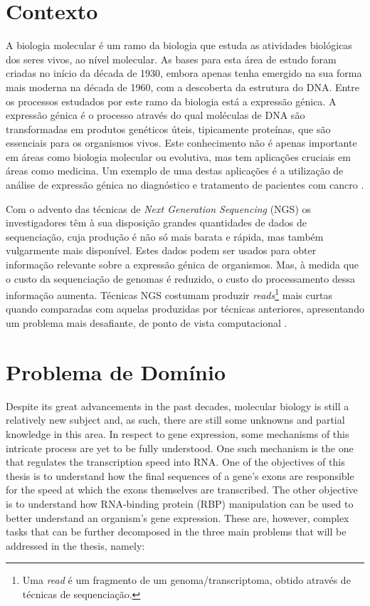 \documentclass[9pt,a4paper]{extarticle}
\begin{document}
\begin{multicols}{2}

\section{Contexto} \label{sec:context}

A biologia molecular é um ramo da biologia que estuda as atividades biológicas
dos seres vivos, ao nível molecular. As bases para esta área de estudo foram
criadas no início da década de 1930, embora apenas tenha emergido na sua forma
mais moderna na década de 1960, com a descoberta da estrutura do DNA. Entre os
processos estudados por este ramo da biologia está a expressão génica. A
expressão génica é o processo através do qual moléculas de DNA são
transformadas em produtos genéticos úteis, tipicamente proteínas, que são
essenciais para os organismos vivos. Este conhecimento não é apenas importante
em áreas como biologia molecular ou evolutiva, mas tem aplicações cruciais em
áreas como medicina. Um exemplo de uma destas aplicações é a utilização de
análise de expressão génica no diagnóstico e tratamento de pacientes com cancro
\cite{Pusztai01062003}.

Com o advento das técnicas de \textit{Next Generation Sequencing} (NGS) os
investigadores têm à sua disposição grandes quantidades de dados de
sequenciação, cuja produção é não só mais barata e rápida, mas também
vulgarmente mais disponível. Estes dados podem ser usados para obter informação
relevante sobre a expressão génica de organismos. Mas, à medida que o custo da
sequenciação de genomas é reduzido, o custo do processamento dessa informação
aumenta. Técnicas NGS costumam produzir \emph{reads}\footnote{Uma \emph{read} é
um fragmento de um genoma/transcriptoma, obtido através de técnicas de
sequenciação.} mais curtas quando comparadas com aquelas produzidas por
técnicas anteriores, apresentando um problema mais desafiante, de ponto de
vista computacional \cite{Wolf2013}.

\section{Problema de Domínio} \label{sec:problem}

Despite its great advancements in the past decades, molecular biology is still a
relatively new subject and, as such, there are still some unknowns and partial
knowledge in this area. In respect to gene expression, some mechanisms of this
intricate process are yet to be fully understood. One such mechanism is the one
that regulates the transcription speed into RNA. One of the objectives of this
thesis is to understand how the final sequences of a gene's exons are
responsible for the speed at which the exons themselves are transcribed. The
other objective is to understand how RNA-binding protein (RBP) manipulation can
be used to better understand an organism's gene expression. These are, however,
complex tasks that can be further decomposed in the three main problems that
will be addressed in the thesis, namely:


\end{multicols}
\end{document}
